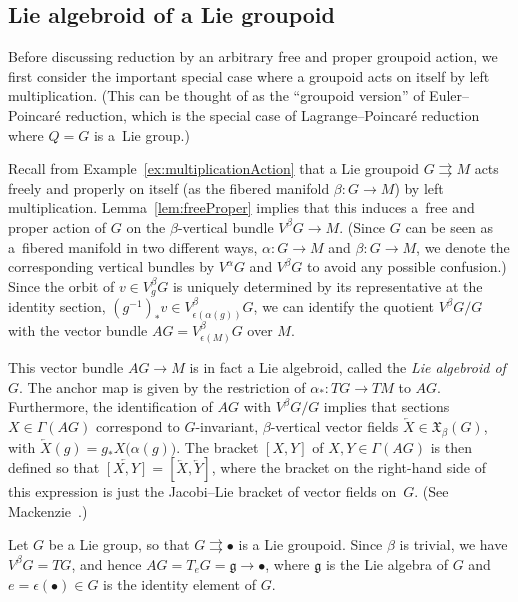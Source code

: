 \documentclass[pdftex]{sigma}
\numberwithin{equation}{section}
\begin{document}
\subsection{Lie algebroid of a Lie groupoid}

Before discussing reduction by an arbitrary free and proper groupoid action, we f\/irst consider the important special case where a groupoid
acts on itself by left multiplication. (This can be thought of as the ``groupoid version'' of Euler--Poincar\'e reduction, which is the special case of Lagrange--Poincar\'e reduction where $ Q = G $ is a~Lie group.)

Recall from Example~\ref{ex:multiplicationAction} that a Lie groupoid $ G \rightrightarrows M $ acts freely and properly on itself (as the f\/ibered manifold $ \beta \colon G \rightarrow M $) by left multiplication. Lemma~\ref{lem:freeProper} implies that this induces a~free and proper action of $G$ on the $\beta$-vertical bundle $ V ^\beta G \rightarrow M $. (Since $G$ can be seen as a~f\/ibered manifold in two dif\/ferent ways, $ \alpha \colon G \rightarrow M $ and $ \beta \colon G \rightarrow M $, we denote the corresponding vertical bundles by $ V ^\alpha G $ and $ V ^\beta G $ to avoid any possible confusion.) Since the orbit of $ v \in V ^\beta _g G $ is uniquely determined by its representative at the identity section, $ ( g ^{-1} ) _\ast v \in V ^\beta _{ \epsilon ( \alpha (g) ) } G $, we can identify the quotient $ V ^\beta G / G $ with the vector bundle $ A G = V ^\beta _{ \epsilon (M) } G $ over $M$.

This vector bundle $ A G \rightarrow M $ is in fact a Lie algebroid, called the \emph{Lie algebroid of $G$}. The anchor map is given by the restriction of $ \alpha _\ast \colon T G \rightarrow T M $ to $ A G $. Furthermore, the identif\/ication of $ A G $ with $ V ^\beta G / G $ implies that sections $ X \in \Gamma ( A G ) $ correspond to $G$-invariant, $\beta$-vertical vector f\/ields $ \overleftarrow{ X } \in \mathfrak{X} _\beta (G) $, with $ \overleftarrow{ X } (g) = g _\ast X \bigl( \alpha (g) \bigr) $. The bracket $ [ X , Y ] $ of $ X, Y \in \Gamma ( A G ) $ is then def\/ined so that $ \overleftarrow{ [X,Y] } = [ \overleftarrow{ X }, \overleftarrow{ Y }] $, where the bracket on the right-hand side of this expression is just the Jacobi--Lie bracket of vector f\/ields on~$G$. (See Mackenzie~\cite{Mackenzie2005}.)

\begin{Example}Let $G$ be a Lie group, so that $ G \rightrightarrows \bullet $ is a Lie groupoid. Since $ \beta $ is trivial, we have $ V ^\beta G = T G $, and hence $ A G = T _e G = \mathfrak{g} \rightarrow \bullet $, where $ \mathfrak{g} $ is the Lie algebra of $G$ and $ e = \epsilon ( \bullet ) \in G $ is the identity element of $G$.
\end{Example}
\end{document}
